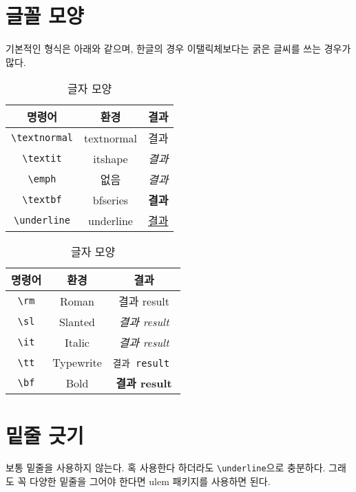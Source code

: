 			
	

	\clearpage  \null
	\section{글꼴 모양}
	
		기본적인 형식은 아래와 같으며, 한글의 경우 이탤릭체보다는 굵은 글씨를 쓰는 경우가 많다.
		
	
			\begin{table}[hbp]
			\caption{글자 모양}
			\centering
			\begin{tabular}{c c c}
			\toprule
			명령어 & 환경 & 결과 \\
			\toprule
			\verb|\textnormal|	& textnormal 	& 결과 \\
			\verb|\textit|		& itshape		& \Large\textit{결과} \\
			\verb|\emph| 		& 없음			& \Large\emph{결과} \\
			\verb|\textbf|		& bfseries	 	& \Large\textbf{결과} \\
			\verb|\underline| 	& underline 		& \Large\underline{결과} \\
			\bottomrule
			\end{tabular}%
			\end{table}%
	
	
			\begin{table}[hbp]
			\caption{글자 모양}
			\centering
			\begin{tabular}{c c c}
			\toprule
			명령어 & 환경 & 결과 \\
			\toprule
			\verb|\rm|	& Roman 	& \rm{결과 result} \\
			\verb|\sl|	& Slanted	& \sl{결과 result} \\
			\verb|\it| 	& Italic		& \it{결과 result} \\
			\verb|\tt|	& Typewrite	& \tt{결과 result} \\
			\verb|\bf| 	& Bold 		& \bf{결과 result} \\
			\bottomrule
			\end{tabular}%
			\end{table}%

	
		
	\clearpage \null
	\section{밑줄 긋기}
	
		보통 밑줄을 사용하지 않는다. 혹 사용한다 하더라도 \verb|\underline|으로 충분하다. 
		그래도 꼭 다양한 밑줄을 그어야 한다면 ulem 패키지를 사용하면 된다.
















